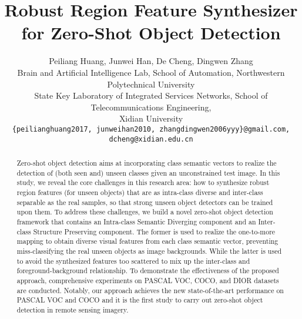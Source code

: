\documentclass[10pt,twocolumn,letterpaper]{article}
\begin{document}
\title{Robust Region Feature Synthesizer for Zero-Shot Object Detection}

\author{Peiliang Huang, Junwei Han, De Cheng, Dingwen Zhang\\
Brain and Artificial Intelligence Lab, School of Automation, Northwestern Polytechnical University\\
State Key Laboratory of Integrated Services Networks, School of Telecommunications Engineering, \\Xidian University\\
{\tt\small \{peilianghuang2017, junweihan2010, zhangdingwen2006yyy\}@gmail.com, dcheng@xidian.edu.cn}
}
\maketitle

\begin{abstract}
  Zero-shot object detection aims at incorporating class semantic vectors to realize the detection of (both seen and) unseen classes given an unconstrained test image. In this study, we reveal the core challenges in this research area: how to synthesize robust region features (for unseen objects) that are as intra-class diverse and inter-class separable as the real samples, so that strong unseen object detectors can be trained upon them. To address these challenges, we build a novel zero-shot object detection framework that contains an Intra-class Semantic Diverging component and an Inter-class Structure Preserving component. The former is used to realize the one-to-more mapping to obtain diverse visual features from each class semantic vector, preventing miss-classifying the real unseen objects as image backgrounds. While the latter is used to avoid the synthesized features too scattered to mix up the inter-class and foreground-background relationship. To demonstrate the effectiveness of the proposed approach, comprehensive experiments on PASCAL VOC, COCO, and DIOR datasets are conducted. Notably, our approach achieves the new state-of-the-art performance on PASCAL VOC and COCO and it is the first study to carry out zero-shot object detection in remote sensing imagery.

\end{abstract}

\vspace{-6mm}
\end{document}
